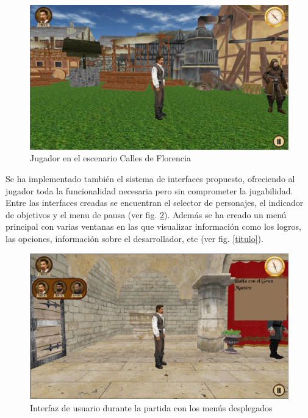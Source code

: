 \begin{figure}[H]
\begin{center}
\includegraphics[scale=0.5]{imagenes/escenarios.png}
\caption{Jugador en el escenario Calles de Florencia}
\label{escenarios}
\end{center}
\end{figure}

Se ha implementado también el sistema de interfaces propuesto, ofreciendo al jugador  toda la funcionalidad necesaria pero sin comprometer la jugabilidad. Entre las interfaces creadas se encuentran  el selector de personajes, el indicador de objetivos y el menu de pausa (ver fig. \ref{iu}). Además se ha creado un menú principal con varias ventanas en las que visualizar información como los logros, las opciones, información sobre el desarrollador, etc (ver fig. \ref{titulo}).

\begin{figure}[H]
\begin{center}
\includegraphics[scale=0.5]{imagenes/iu.png}
\caption{Interfaz de usuario durante la partida con los menús desplegados}
\label{iu}
\end{center}
\end{figure}


